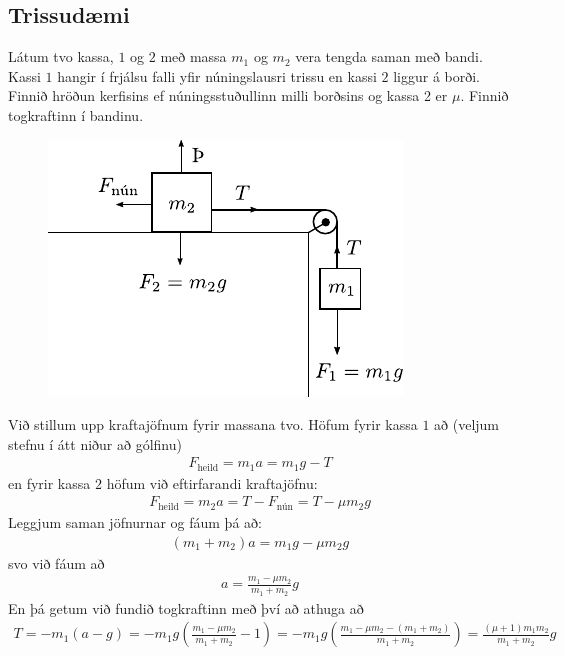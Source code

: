 \subsection*{Trissudæmi}

Látum tvo kassa, $1$ og $2$ með massa $m_1$ og $m_2$ vera tengda saman með bandi. Kassi $1$ hangir í frjálsu falli yfir núningslausri trissu en kassi $2$ liggur á borði. Finnið hröðun kerfisins ef núningsstuðullinn milli borðsins og kassa 2 er $\mu$. Finnið togkraftinn í bandinu.

\begin{figure}[H]
    \centering
    \includegraphics{figures/trissudaemi.pdf}
\end{figure}

Við stillum upp kraftajöfnum fyrir massana tvo. Höfum fyrir kassa $1$ að (veljum stefnu í átt niður að gólfinu)
\begin{align*} 
F_{\text{heild}} = m_1a = m_1g - T
\end{align*}
en fyrir kassa $2$ höfum við eftirfarandi kraftajöfnu:
\begin{align*}
    F_{\text{heild}} = m_2a = T - F_{\text{nún}} = T - \mu m_2 g
\end{align*}
Leggjum saman jöfnurnar og fáum þá að:
\begin{align*}
    (m_1 + m_2)a = m_1g - \mu m_2 g
\end{align*}
svo við fáum að
\begin{align*}
    a = \frac{m_1-\mu m_2}{m_1 + m_2}g
\end{align*}
En þá getum við fundið togkraftinn með því að athuga að
\begin{align*}
    T = -m_1(a-g) = -m_1 g \left( \frac{m_1-\mu m_2}{m_1 + m_2} - 1 \right) = -m_1 g \left( \frac{m_1 - \mu m_2 - \left( m_1 + m_2 \right)}{m_1 + m_2} \right) = \frac{(\mu +1)m_1 m_2}{m_1 + m_2}g
\end{align*}

